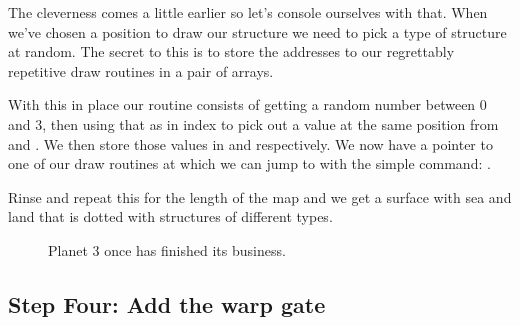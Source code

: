 %


The cleverness comes a little earlier so let's console ourselves with that. When we've chosen a position to draw
our structure we need to pick a type of structure at random. The secret to this is to store the addresses to our
regrettably repetitive draw routines in a pair of arrays. 


%


With this in place our routine consists of getting a random number between 0 and 3, then using that as in index to pick
out a value at the same position from  and .
We then store those values in  and  respectively. We now
have a pointer to one of our draw routines at  which we can jump to with the simple
command: . 

%


Rinse and repeat this for the length of the map and we get a surface with sea and land that is dotted with structures
of different types.

\begin{figure}[H]
  {
    \begin{adjustbox}{width=10cm,center}
    \end{adjustbox}
  }\caption[]{Planet 3 once  has finished its business.}
\end{figure}

\subsection{Step Four: Add the warp gate}


